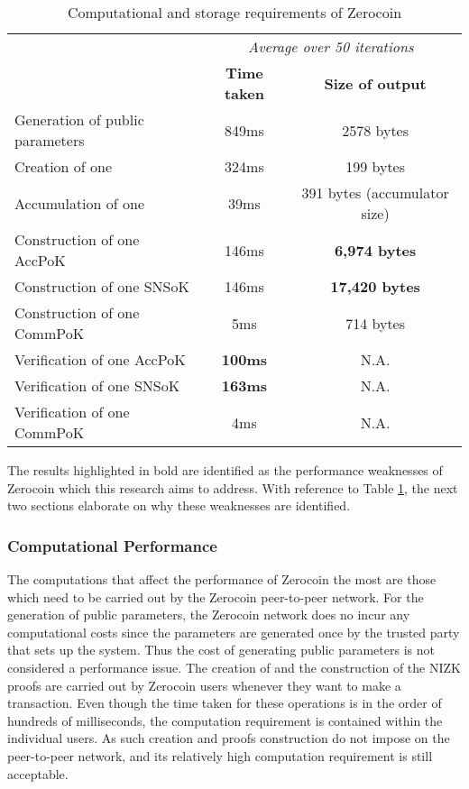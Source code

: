 \begin{table}[H]
	\centering
	\begin{tabular}{ l | c | c }
		\multirow{2}{*}{} & \multicolumn{2}{c}{\textit{Average over 50 iterations}} \\
		& \textbf{Time taken} & \textbf{Size of output} \\ 		
		\hline 
		\hline
		Generation of public parameters & 849ms & 2578 bytes \\
		\hline
		Creation of one \kwCoin{} & 324ms & 199 bytes \\
		Accumulation of one \kwCoin{} & 39ms & 391 bytes (accumulator size) \\
		\hline
		Construction of one AccPoK & 146ms & \textbf{6,974 bytes} \\
		Construction of one SNSoK & 146ms & \textbf{17,420 bytes} \\
		Construction of one CommPoK & 5ms & 714 bytes \\
		\hline
		Verification of one AccPoK & \textbf{100ms} & N.A. \\
		Verification of one SNSoK & \textbf{163ms} & N.A. \\
		Verification of one CommPoK & 4ms & N.A. \\
		\hline
	\end{tabular}
	\caption{Computational and storage requirements of Zerocoin}
	\label{tab:zerocoin_comp_storage}
\end{table}

The results highlighted in bold are identified as the performance weaknesses of Zerocoin which this research aims to address. With reference to Table \ref{tab:zerocoin_comp_storage}, the next two sections elaborate on why these weaknesses are identified. 

\subsubsection{Computational Performance}
\label{sec:3-Computational Performance}
The computations that affect the performance of Zerocoin the most are those which need to be carried out by the Zerocoin peer-to-peer network. For the generation of public parameters, the Zerocoin network does no incur any computational costs since the parameters are generated once by the trusted party that sets up the system. Thus the cost of generating public parameters is not considered a performance issue. The creation of  and the construction of the NIZK proofs are carried out by Zerocoin users whenever they want to make a transaction. Even though the time taken for these operations is in the order of hundreds of milliseconds, the computation requirement is contained within the individual users. As such \kwCoin{} creation and proofs construction do not impose on the peer-to-peer network, and its relatively high computation requirement is still acceptable.

